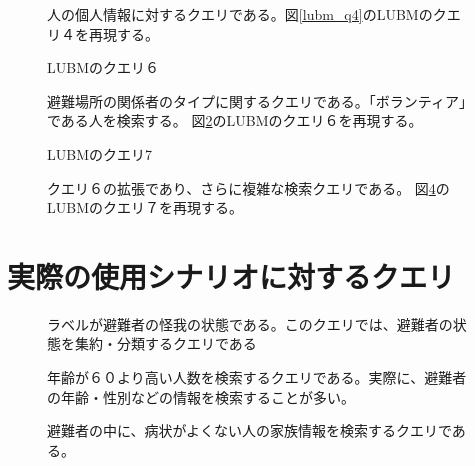 \begin{figure}[h!]
	
	\caption{
	人の個人情報に対するクエリである。図\ref{lubm_q4}のLUBMのクエリ４を再現する。}
	\label{sibm_q4}
\end{figure}

\begin{figure}[h!]
	
	\caption{LUBMのクエリ６}
	\label{lubm_q6}
\end{figure}

\begin{figure}[h!]
	
	\caption{
	避難場所の関係者のタイプに関するクエリである。「ボランティア」である人を検索する。
	図\ref{lubm_q6}のLUBMのクエリ６を再現する。}
	\label{sibm_q6}
\end{figure}

\begin{figure}[h!]
	
	\caption{LUBMのクエリ7}
	\label{lubm_q7}
\end{figure}

\begin{figure}[h!]
	
	\caption{
	クエリ６の拡張であり、さらに複雑な検索クエリである。
	図\ref{lubm_q7}のLUBMのクエリ７を再現する。}
	\label{sibm_q7}
\end{figure}

\section{実際の使用シナリオに対するクエリ}

\begin{figure}[h!]
	
	\caption{ラベルが避難者の怪我の状態である。このクエリでは、避難者の状態を集約・分類するクエリである}
	\label{sibm_q8}
\end{figure}

\begin{figure}[h!]
	
	\caption{年齢が６０より高い人数を検索するクエリである。実際に、避難者の年齢・性別などの情報を検索することが多い。}
	\label{sibm_q9}
\end{figure}

\begin{figure}[h!]
	
	\caption{避難者の中に、病状がよくない人の家族情報を検索するクエリである。}
	\label{sibm_q10}
\end{figure}

